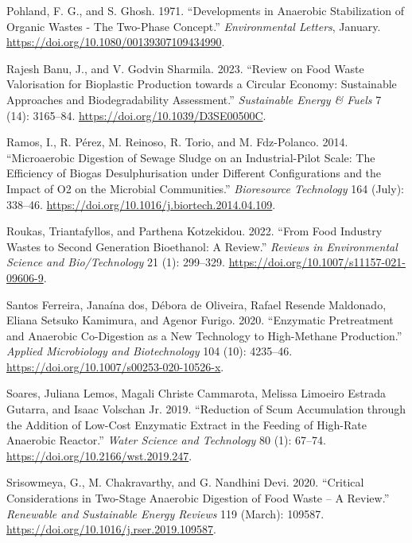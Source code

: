 \documentclass[11pt]{report}
\begin{document}
\begin{hangparas}{1.5em}{1}
\hypertarget{citeproc_bib_item_30}{Pohland, F. G., and S. Ghosh. 1971. “Developments in Anaerobic Stabilization of Organic Wastes - The Two-Phase Concept.” \textit{Environmental Letters}, January. \url{https://doi.org/10.1080/00139307109434990}.}

\hypertarget{citeproc_bib_item_31}{Rajesh Banu, J., and V. Godvin Sharmila. 2023. “Review on Food Waste Valorisation for Bioplastic Production towards a Circular Economy: Sustainable Approaches and Biodegradability Assessment.” \textit{Sustainable Energy \& Fuels} 7 (14): 3165–84. \url{https://doi.org/10.1039/D3SE00500C}.}

\hypertarget{citeproc_bib_item_32}{Ramos, I., R. Pérez, M. Reinoso, R. Torio, and M. Fdz-Polanco. 2014. “Microaerobic Digestion of Sewage Sludge on an Industrial-Pilot Scale: The Efficiency of Biogas Desulphurisation under Different Configurations and the Impact of O2 on the Microbial Communities.” \textit{Bioresource Technology} 164 (July): 338–46. \url{https://doi.org/10.1016/j.biortech.2014.04.109}.}

\hypertarget{citeproc_bib_item_33}{Roukas, Triantafyllos, and Parthena Kotzekidou. 2022. “From Food Industry Wastes to Second Generation Bioethanol: A Review.” \textit{Reviews in Environmental Science and Bio/Technology} 21 (1): 299–329. \url{https://doi.org/10.1007/s11157-021-09606-9}.}

\hypertarget{citeproc_bib_item_34}{Santos Ferreira, Janaína dos, Débora de Oliveira, Rafael Resende Maldonado, Eliana Setsuko Kamimura, and Agenor Furigo. 2020. “Enzymatic Pretreatment and Anaerobic Co-Digestion as a New Technology to High-Methane Production.” \textit{Applied Microbiology and Biotechnology} 104 (10): 4235–46. \url{https://doi.org/10.1007/s00253-020-10526-x}.}

\hypertarget{citeproc_bib_item_35}{Soares, Juliana Lemos, Magali Christe Cammarota, Melissa Limoeiro Estrada Gutarra, and Isaac Volschan Jr. 2019. “Reduction of Scum Accumulation through the Addition of Low-Cost Enzymatic Extract in the Feeding of High-Rate Anaerobic Reactor.” \textit{Water Science and Technology} 80 (1): 67–74. \url{https://doi.org/10.2166/wst.2019.247}.}

\hypertarget{citeproc_bib_item_36}{Srisowmeya, G., M. Chakravarthy, and G. Nandhini Devi. 2020. “Critical Considerations in Two-Stage Anaerobic Digestion of Food Waste – A Review.” \textit{Renewable and Sustainable Energy Reviews} 119 (March): 109587. \url{https://doi.org/10.1016/j.rser.2019.109587}.}


\end{hangparas}
\end{document}
